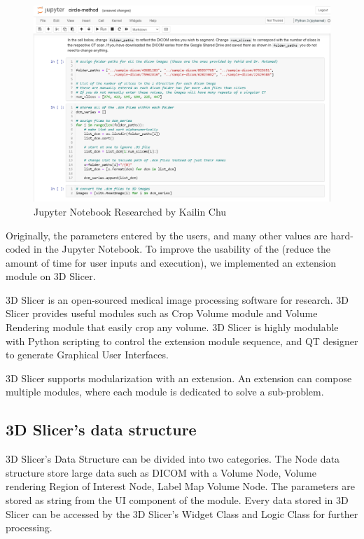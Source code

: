 \begin{figure}[H]
    \centering
    \includegraphics[width=\textwidth]{figures/AGR/jupyter_research.png}
    \caption[Jupyter Notebook Research]{Jupyter Notebook Researched by Kailin Chu}
    \label{fig_jnr}
\end{figure}

Originally, the parameters entered by the users, and many other values are hard-coded in the Jupyter Notebook. To improve the usability of the \progname{} (reduce the amount of time for user inputs and execution), we implemented an extension module on 3D Slicer. 

3D Slicer is an open-sourced medical image processing software for research. 3D Slicer provides useful modules such as Crop Volume module and Volume Rendering module that easily crop any volume. 3D Slicer is highly modulable with Python scripting to control the extension module sequence, and QT designer to generate Graphical User Interfaces.

3D Slicer supports modularization with an extension. An extension can compose multiple modules, where each module is dedicated to solve a sub-problem.

\subsection{3D Slicer's data structure}

3D Slicer's Data Structure can be divided into two categories. The Node data structure store large data such as DICOM with a Volume Node, Volume rendering Region of Interest Node, Label Map Volume Node. The parameters are stored as string from the UI component of the module. Every data stored in 3D Slicer can be accessed by the 3D Slicer's Widget Class and Logic Class for further processing. 

